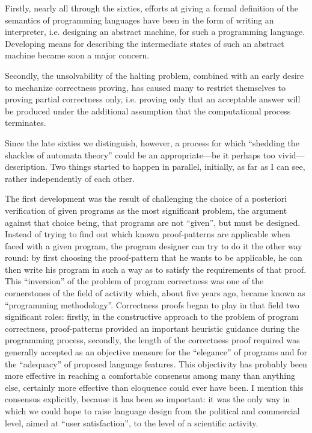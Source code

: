 \documentclass[12pt,letterpaper]{article}
\begin{document}
Firstly, nearly all through the sixties, efforts at giving a formal definition
of the semantics of programming languages have been in the form of writing an
interpreter, i.e. designing an abstract machine, for such a programming
language. Developing means for describing the intermediate states of such an
abstract machine became soon a major concern.

Secondly, the unsolvability of the halting 
problem, combined with an early desire to mechanize correctness proving,
has caused many to restrict themselves to proving partial correctness 
only, i.e. proving only that an acceptable answer 
will be produced under the additional assumption 
that the computational process terminates. 

Since the late sixties we distinguish, however, 
a process for which ``shedding the shackles of automata theory'' could
be an appropriate---be it perhaps too vivid---description. Two things started 
to happen in parallel, initially, as far as I can 
see, rather independently of each other. 

The first development was the result of challenging the choice of a posteriori
verification of given programs as the most significant problem, the argument
against that choice being, that programs are not ``given'', but must be
designed. Instead of trying to find out which known proof-patterns are
applicable when faced with a given program, the program designer can try to do
it the other way round: by first choosing the proof-pattern that he wants to be
applicable, he can then write his program in such a way as to satisfy the
requirements of that proof. This ``inversion'' of the problem of program
correctness was one of the cornerstones of the field of activity which, about
five years ago, became known as ``programming methodology''. Correctness proofs
began to play in that field two significant roles: firstly, in the constructive
approach to the problem of program correctness, proof-patterns provided an
important heuristic guidance during the programming process, secondly, the
length of the correctness proof required was generally accepted as an objective
measure for the ``elegance'' of programs and for the ``adequacy'' of proposed
language features. This objectivity has probably been more effective in
reaching a comfortable consensus among many than anything else, certainly more
effective than eloquence could ever have been. I mention this consensus
explicitly, because it has been so important: it was the only way in which we
could hope to raise language design from the political and commercial level,
aimed at ``user satisfaction'', to the level of a scientific activity. 
\end{document}
